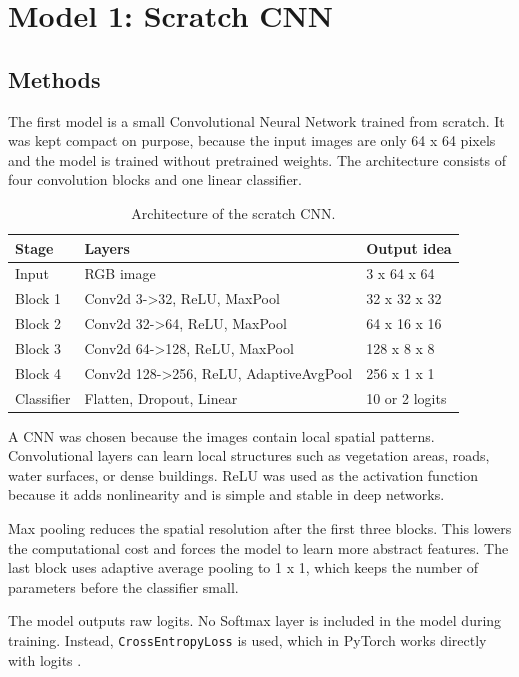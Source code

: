 \section{Model 1: Scratch CNN}
\label{sec:model1}

\subsection{Methods}

The first model is a small Convolutional Neural Network trained from scratch.
It was kept compact on purpose, because the input images are only 64 x 64
pixels and the model is trained without pretrained weights. The architecture
consists of four convolution blocks and one linear classifier.

\begin{table}[H]
\centering
\caption{Architecture of the scratch CNN.}
\label{tab:architecture}
\begin{tabularx}{\textwidth}{lXX}
\toprule
Stage & Layers & Output idea \\
\midrule
Input & RGB image & 3 x 64 x 64 \\
Block 1 & Conv2d 3->32, ReLU, MaxPool & 32 x 32 x 32 \\
Block 2 & Conv2d 32->64, ReLU, MaxPool & 64 x 16 x 16 \\
Block 3 & Conv2d 64->128, ReLU, MaxPool & 128 x 8 x 8 \\
Block 4 & Conv2d 128->256, ReLU, AdaptiveAvgPool & 256 x 1 x 1 \\
Classifier & Flatten, Dropout, Linear & 10 or 2 logits \\
\bottomrule
\end{tabularx}
\end{table}

A CNN was chosen because the images contain local spatial patterns.
Convolutional layers can learn local structures such as vegetation areas,
roads, water surfaces, or dense buildings. ReLU was used as the activation
function because it adds nonlinearity and is simple and stable in deep
networks.

Max pooling reduces the spatial resolution after the first three blocks. This
lowers the computational cost and forces the model to learn more abstract
features. The last block uses adaptive average pooling to 1 x 1, which keeps
the number of parameters before the classifier small.

The model outputs raw logits. No Softmax layer is included in the model during
training. Instead, \texttt{CrossEntropyLoss} is used, which in PyTorch works
directly with logits \cite{pytorch}.

